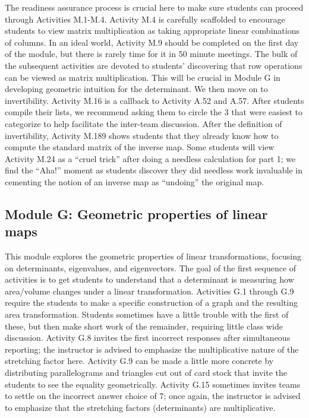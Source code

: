 \documentclass{article}
\begin{document}
The readiness assurance process is crucial here to make sure students can proceed through Activities M.1-M.4.  Activity M.4 is carefully  scaffolded to encourage students to view matrix multiplication as taking appropriate linear combinations of columns. 
In an ideal world, Activity M.9 should be completed on the first day of the module, but there is rarely time for it in 50 minute meetings.  The bulk of the subsequent activities are devoted to students' discovering that row operations can be viewed as matrix multiplication.  This will be crucial in Module G in developing geometric intuition for the determinant.  We then move on to invertibility.  Activity M.16 is a callback to Activity A.52 and A.57.  After students compile their lists, we recommend asking them to circle the 3 that were easiest to categorize to help facilitate the inter-team discussion.   After the definition of invertibility, Activity M.189 shows students that they already know how to compute the standard matrix of the inverse map.  Some students will view Activity M.24 as a ``cruel trick'' after doing a needless calculation for part 1; we find the ``Aha!'' moment as students discover they did needless work invaluable in cementing the notion of an inverse map as ``undoing'' the original map.

\subsection*{Module G: Geometric properties of linear maps}

This module explores the geometric properties of linear transformations, focusing on determinants, eigenvalues, and eigenvectors.  
The goal of the first sequence of activities is to get students to understand that a determinant is measuring how area/volume changes under a linear transformation.  Activities G.1 through G.9 require the students to make a specific construction of a graph and the resulting area transformation.  Students sometimes have a little trouble with the first of these, but then make short work of the remainder, requiring little class wide discussion.  Activity G.8 invites the first incorrect responses after simultaneous reporting; the instructor is advised to emphasize the multiplicative nature of the stretching factor here.  Activity G.9 can be made a little more concrete by distributing parallelograms and triangles cut out of card stock that invite the students to see the equality geometrically.  Activity G.15 sometimes invites teams to settle on the incorrect answer choice of 7; once again, the instructor is advised to emphasize that the stretching factors (determinants) are multiplicative.
\end{document}
